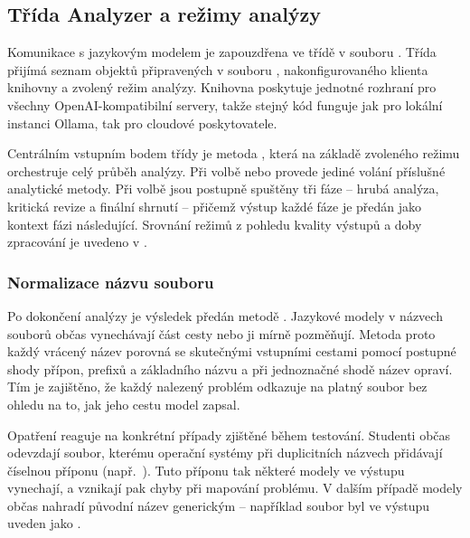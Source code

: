 \subsection{Třída Analyzer a režimy analýzy}
\label{subsec:implementation-analyzer}

Komunikace s jazykovým modelem je zapouzdřena ve třídě  v souboru .
Třída přijímá seznam objektů  připravených v souboru , nakonfigurovaného klienta knihovny  a zvolený režim analýzy.
Knihovna  poskytuje jednotné rozhraní pro všechny OpenAI-kompatibilní servery, takže stejný kód funguje jak pro lokální instanci Ollama, tak pro cloudové poskytovatele.

Centrálním vstupním bodem třídy je metoda , která na základě zvoleného režimu orchestruje celý průběh analýzy.
Při volbě  nebo  provede jediné volání příslušné analytické metody.
Při volbě  jsou postupně spuštěny tři fáze -- hrubá analýza, kritická revize a finální shrnutí -- přičemž výstup každé fáze je předán jako kontext fázi následující.
Srovnání režimů z pohledu kvality výstupů a doby zpracování je uvedeno v .

\subsubsection*{Normalizace názvu souboru}
\label{subsubsec:implementation-analyzer-normalization}

Po dokončení analýzy je výsledek předán metodě .
Jazykové modely v názvech souborů občas vynechávají část cesty nebo ji mírně pozměňují.
Metoda proto každý vrácený název porovná se skutečnými vstupními cestami pomocí postupné shody přípon, prefixů a základního názvu a při jednoznačné shodě název opraví.
Tím je zajištěno, že každý nalezený problém odkazuje na platný soubor bez ohledu na to, jak jeho cestu model zapsal.

Opatření reaguje na konkrétní případy zjištěné během testování.
Studenti občas odevzdají soubor, kterému operační systémy při duplicitních názvech přidávají číselnou příponu (např.\ ).
Tuto příponu tak některé modely ve výstupu vynechají, a vznikají pak chyby při mapování problému.
V dalším případě modely občas nahradí původní název generickým -- například soubor  byl ve výstupu uveden jako .

\endinput